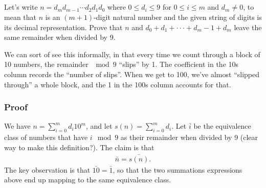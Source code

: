 \documentclass[12pt]{article}
\begin{document}
\subsection{}
Let’s write $n = d_md_{m-1} \cdots d_2d_1d_0$ where $0 \leq d_i \leq 9$ for
$0 \leq i \leq m$ and $d_m \neq 0$, to mean that $n$ is an $(m+1)$-digit natural
number and the given string of digits is its decimal representation. Prove that
$n$ and $d_0 + d_1 + ··· + d_m−1 + d_m$ leave the same remainder
when divided by 9.\\
\begin{mdframed}
  We can sort of see this informally, in that every time we count through a
  block of 10 numbers, the remainder $\mod 9$ ``slips'' by 1. The coefficient
  in the 10s column records the ``number of slips''. When we get to 100, we've
  almost ``slipped through'' a whole block, and the 1 in the 100s column
  accounts for that.
  \subsubsection*{Proof}
  We have $n = \sum_{i=0}^m d_i 10^m$, and let $s(n) = \sum_{i=0}^m d_i$. Let
  $\bar{i}$ be the equivalence class of numbers that have $i \mod 9$ as their
  remainder when divided by 9 (clear way to make this definition?). The claim
  is that
  \begin{align*}
  \bar n = \bar{s(n)}.
  \end{align*}
  The key observation is that $\bar {10} = \bar 1$, so that the two summations
  expressions above end up mapping to the same equivalence class.


\end{mdframed}
\end{document}
